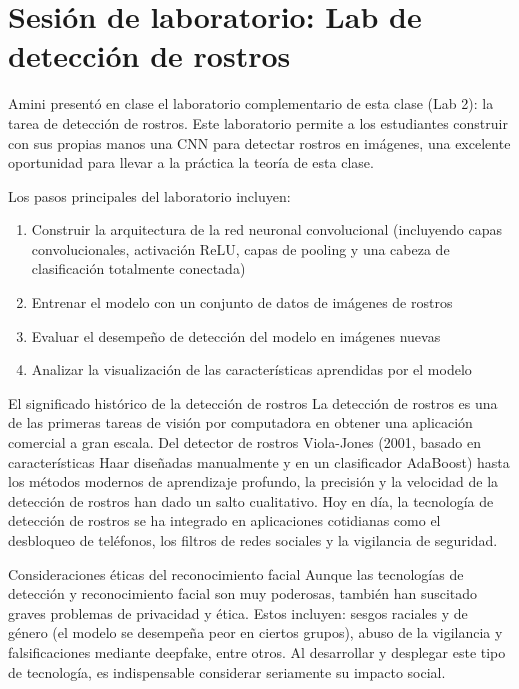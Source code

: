 \section{Sesión de laboratorio: Lab de detección de rostros}

Amini presentó en clase el laboratorio complementario de esta clase (Lab 2): la tarea de detección de rostros. Este laboratorio permite a los estudiantes construir con sus propias manos una CNN para detectar rostros en imágenes, una excelente oportunidad para llevar a la práctica la teoría de esta clase.

Los pasos principales del laboratorio incluyen:
\begin{enumerate}
    \item Construir la arquitectura de la red neuronal convolucional (incluyendo capas convolucionales, activación ReLU, capas de pooling y una cabeza de clasificación totalmente conectada)
    \item Entrenar el modelo con un conjunto de datos de imágenes de rostros
    \item Evaluar el desempeño de detección del modelo en imágenes nuevas
    \item Analizar la visualización de las características aprendidas por el modelo
\end{enumerate}

\begin{knowledgebox}{El significado histórico de la detección de rostros}
La detección de rostros es una de las primeras tareas de visión por computadora en obtener una aplicación comercial a gran escala. Del detector de rostros Viola-Jones (2001, basado en características Haar diseñadas manualmente y en un clasificador AdaBoost) hasta los métodos modernos de aprendizaje profundo, la precisión y la velocidad de la detección de rostros han dado un salto cualitativo. Hoy en día, la tecnología de detección de rostros se ha integrado en aplicaciones cotidianas como el desbloqueo de teléfonos, los filtros de redes sociales y la vigilancia de seguridad.
\end{knowledgebox}

\begin{warningbox}{Consideraciones éticas del reconocimiento facial}
Aunque las tecnologías de detección y reconocimiento facial son muy poderosas, también han suscitado graves problemas de privacidad y ética. Estos incluyen: sesgos raciales y de género (el modelo se desempeña peor en ciertos grupos), abuso de la vigilancia y falsificaciones mediante deepfake, entre otros. Al desarrollar y desplegar este tipo de tecnología, es indispensable considerar seriamente su impacto social.
\end{warningbox}

\newpage
